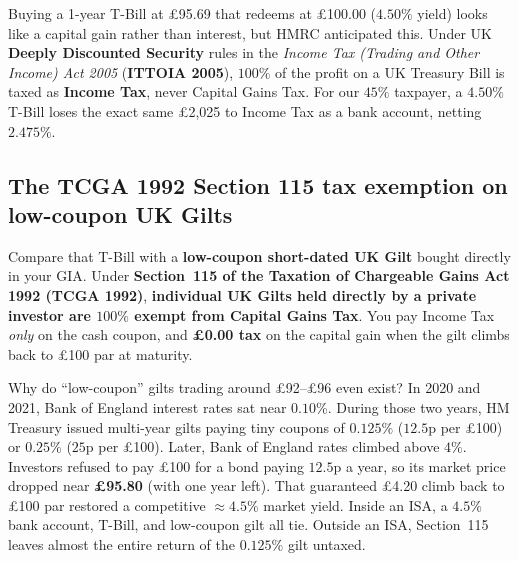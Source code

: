Buying a 1-year T-Bill at \pounds 95.69 that redeems at \pounds 100.00 ($4.50\%$ yield) looks like a capital gain rather than interest, but HMRC anticipated this. Under UK \textbf{Deeply Discounted Security} rules in the \emph{Income Tax (Trading and Other Income) Act 2005} (\textbf{ITTOIA 2005}), $100\%$ of the profit on a UK Treasury Bill is taxed as \textbf{Income Tax}, never Capital Gains Tax. For our $45\%$ taxpayer, a $4.50\%$ T-Bill loses the exact same \pounds 2,025 to Income Tax as a bank account, netting \textbf{$2.475\%$}.

\subsection{The TCGA 1992 Section 115 tax exemption on low-coupon UK Gilts}

Compare that T-Bill with a \textbf{low-coupon short-dated UK Gilt} bought directly in your GIA. Under \textbf{Section~115 of the Taxation of Chargeable Gains Act 1992 (TCGA 1992)}, \textbf{individual UK Gilts held directly by a private investor are $100\%$ exempt from Capital Gains Tax}. You pay Income Tax \emph{only} on the cash coupon, and \textbf{\pounds 0.00 tax} on the capital gain when the gilt climbs back to \pounds 100 par at maturity.

\begin{happeningbox}
Why do ``low-coupon'' gilts trading around \pounds 92--\pounds 96 even exist? In 2020 and 2021, Bank of England interest rates sat near $0.10\%$. During those two years, HM Treasury issued multi-year gilts paying tiny coupons of \textbf{$0.125\%$} ($12.5\text{p}$ per \pounds 100) or \textbf{$0.25\%$} ($25\text{p}$ per \pounds 100). Later, Bank of England rates climbed above $4\%$. Investors refused to pay \pounds 100 for a bond paying $12.5\text{p}$ a year, so its market price dropped near \textbf{\pounds 95.80} (with one year left). That guaranteed \pounds 4.20 climb back to \pounds 100 par restored a competitive $\approx 4.5\%$ market yield. Inside an ISA, a $4.5\%$ bank account, T-Bill, and low-coupon gilt all tie. Outside an ISA, Section~115 leaves almost the entire return of the $0.125\%$ gilt untaxed.
\end{happeningbox}


